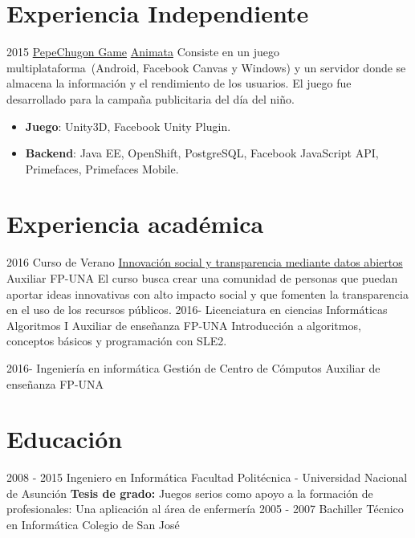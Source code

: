 \documentclass[]{friggeri-cv}
\begin{document}
\section{Experiencia Independiente}
\proyectof
    {2015}
    {\href{https://apps.facebook.com/pechugon_pepe}{PepeChugon Game}}
    {\href{http://www.animata.com.py/}{Animata}}
    {Consiste en un juego multiplataforma~(Android, Facebook Canvas y Windows)
        y un servidor donde se almacena la información y el rendimiento de los
        usuarios. El juego fue desarrollado para la campaña publicitaria del día
        del niño.}
    {\begin{itemize}
            \item \textbf{Juego}: Unity3D, Facebook Unity Plugin.
            \item \textbf{Backend}: Java EE, OpenShift, PostgreSQL, Facebook
                JavaScript API, Primefaces, Primefaces Mobile.
        \end{itemize}}

    \section{Experiencia académica}
\clase
    {2016}
    {Curso de Verano}
    {\href{http://www.pol.una.py/cursosverano/index.php?option=com_content&view=article&layout=edit&id=91}{Innovación
            social y transparencia mediante datos abiertos}} 
    {Auxiliar}
    {FP-UNA}
    {El curso busca crear una comunidad de personas que puedan aportar ideas
        innovativas con alto impacto social y que fomenten la transparencia en
        el uso de los recursos públicos. }
\clase
    {2016-}
    {Licenciatura en ciencias Informáticas}
    {Algoritmos I} 
    {Auxiliar de enseñanza}
    {FP-UNA}
    {Introducción a algoritmos, conceptos básicos y programación con SLE2.}

\clase
    {2016-}
    {Ingeniería en informática}
    {Gestión de Centro de Cómputos} 
    {Auxiliar de enseñanza}
    {FP-UNA}
    {}

\section{Educación}
\begin{entrylist}
  \entry
    {2008 - 2015}
    {Ingeniero en Informática}
    {Facultad Politécnica - Universidad Nacional de Asunción}
    {\textbf{Tesis de grado:} Juegos serios como apoyo a la formación de profesionales: Una aplicación al área de enfermería}
  \entry
    {2005 - 2007}
    {Bachiller Técnico en Informática}
    {Colegio de San José}
    {}
\end{entrylist}
\end{document}
